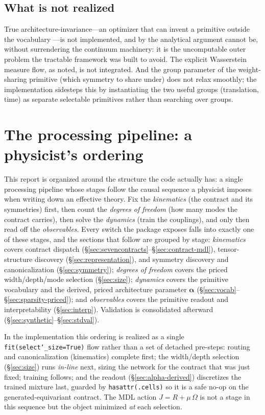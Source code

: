 \documentclass[11pt]{article}
\newcommand{\allowbreakhere}{\discretionary{}{}{}}
\newcommand{\code}[1]{\texttt{\def\_{\char`_\allowbreakhere}#1}}
\newcommand{\alphapar}{\bm{\alpha}}
\begin{document}
\subsection{What is not realized}
\label{sec:unrealized}

True architecture-invariance---an optimizer that can invent a primitive outside the vocabulary
---is not implemented, and by the analytical argument cannot be, without surrendering the
continuum machinery: it is the uncomputable outer problem the tractable framework was built to
avoid. The explicit Wasserstein measure flow, as noted, is not integrated. And the group
parameter of the weight-sharing primitive (which symmetry to share under) does not relax
smoothly; the implementation sidesteps this by instantiating the two useful groups
(translation, time) as separate selectable primitives rather than searching over groups.

\section{The processing pipeline: a physicist's ordering}
\label{sec:ordering}

This report is organized around the structure the code actually has: a single processing pipeline whose
stages follow the causal sequence a physicist imposes when writing down an effective theory. Fix the
\emph{kinematics} (the contract and its symmetries) first, then count the \emph{degrees of freedom} (how
many modes the contract carries), then solve the \emph{dynamics} (train the couplings), and only then read
off the \emph{observables}. Every switch the package exposes falls into exactly one of these stages, and
the sections that follow are grouped by stage: \emph{kinematics} covers contract dispatch
(\S\ref{sec:sevencontracts}--\S\ref{sec:contract-mdl}), tensor-structure discovery (\S\ref{sec:representation}),
and symmetry discovery and canonicalization (\S\ref{sec:symmetry}); \emph{degrees of freedom} covers the
priced width/depth/mode selection (\S\ref{sec:size}); \emph{dynamics} covers the primitive vocabulary
and the derived, priced architecture parameter $\alphapar$
(\S\ref{sec:vocab}--\S\ref{sec:sparsity-priced}); and \emph{observables} covers the primitive readout and
interpretability (\S\ref{sec:interp}). Validation is consolidated afterward
(\S\ref{sec:synthetic}--\S\ref{sec:stdval}).

In the implementation this ordering is realized as a single \code{fit(select\_size=True)} flow rather than
a set of detached pre-steps: routing and canonicalization (kinematics) complete first; the width/depth
selection (\S\ref{sec:size}) runs \emph{in-line} next, sizing the network for the contract that was just
fixed; training follows; and the readout (\S\ref{sec:alpha-derived}) discretizes the trained mixture
last, guarded by
\code{hasattr(.cells)} so it is a safe no-op on the generated-equivariant contract. The MDL action
$J=R+\mu\,\Omega$ is not a stage in this sequence but the object minimized \emph{at} each selection.
\end{document}

